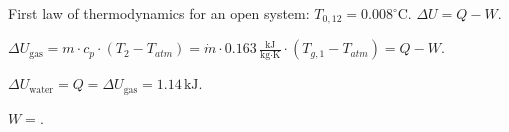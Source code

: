 First law of thermodynamics for an open system: \( T_{0,12} = 0.008^\circ \text{C} \).  
\( \Delta U = Q - W \).  

\( \Delta U_{\text{gas}} = m \cdot c_p \cdot (T_2 - T_{atm}) = \dot{m} \cdot 0.163 \, \frac{\text{kJ}}{\text{kg·K}} \cdot (T_{g,1} - T_{atm}) = Q - W \).  

\( \Delta U_{\text{water}} = Q = \Delta U_{\text{gas}} = 1.14 \, \text{kJ} \).  

\( W = \).